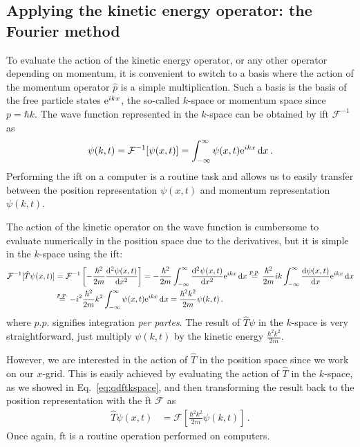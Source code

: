 \subsection{Applying the kinetic energy operator: the Fourier method}


To evaluate the action of the kinetic energy operator, or any other operator depending on momentum, it is convenient to switch to a basis where the action of the momentum operator $\hat{p}$ is a simple multiplication. Such a basis is the basis of the free particle states $\mathrm{e}^{ikx}$, the so-called $k$-space or momentum space since $p = \hbar k$. The wave function represented in the $k$-space can be obtained by \acrfull{ift} $\mathcal{F}^{-1}$ as
\begin{align}
    \psi(k,t) = \mathcal{F}^{-1}[\psi(x,t)] =\int_{-\infty}^\infty \psi(x,t) \mathrm{e}^{ikx}\mathop{}\!\mathrm{d} x \, .
\end{align}
Performing the \acrshort{ift} on a computer is a routine task and allows us to easily transfer between the position representation $\psi(x,t)$ and momentum representation $\psi(k,t)$.

The action of the kinetic operator on the wave function is cumbersome to evaluate numerically in the position space due to the derivatives, but it is simple in the $k$-space using the \acrshort{ift}:
\begin{align}
    \mathcal{F}^{-1}[\hat{T}\psi(x,t)] &= \mathcal{F}^{-1}\left[-\frac{\hbar^2}{2m}\frac{\dd^2 \psi(x,t)}{\dd x^2}\right] = -\frac{\hbar^2}{2m} \int_{-\infty}^\infty \frac{\dd^2 \psi(x,t)}{\dd x^2}  \e^{ikx}\dd x \stackrel{p.p.}{=} \frac{\hbar^2}{2m} i k \int_{-\infty}^\infty \frac{\dd \psi(x,t)}{\dd x} \e^{ikx}\dd x \notag \\
    &\stackrel{p.p.}{=} - i^2 \frac{\hbar^2}{2m} k^2 \int_{-\infty}^\infty \psi(x,t) \e^{ikx}\dd x = \frac{\hbar^2 k^2}{2m} \psi(k,t) \, .
    \label{eq:qdftkspace}
\end{align}
where $p.p.$ signifies integration \textit{per partes}. The result of $\hat{T}\psi$ in the $k$-space is very straightforward, just multiply $\psi(k,t)$ by the kinetic energy $\frac{\hbar^2 k^2}{2m}$.

However, we are interested in the action of $\hat{T}$ in the position space since we work on our $x$-grid. This is easily achieved by evaluating the action of $\hat{T}$ in the $k$-space, as we showed in Eq.~\eqref{eq:qdftkspace}, and then transforming the result back to the position representation with the \acrfull{ft} $\mathcal{F}$ as
\begin{align}
    \hat{T}\psi(x,t) &= \mathcal{F}\left[\frac{\hbar^2 k^2}{2m} \psi(k,t)\right] \, .
\end{align}
Once again, \acrshort{ft} is a routine operation performed on computers.

